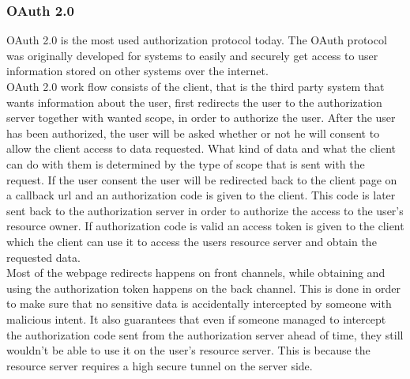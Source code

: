 \subsubsection{OAuth 2.0}
OAuth 2.0 is the most used authorization protocol today. The OAuth protocol was originally developed for systems to easily and securely get access to user information stored on other systems over the internet.
\\[11pt]
OAuth 2.0 work flow consists of the client, that is the third party system that wants information about the user, first redirects the user to the authorization server together with wanted scope, in order to authorize the user. After the user has been authorized, the user will be asked whether or not he will consent to allow the client access to data requested. What kind of data and what the client can do with them is determined by the type of scope that is sent with the request. If the user consent the user will be redirected back to the client page on a callback url and an authorization code is given to the client. This code is later sent back to the authorization server in order to authorize the access to the user's resource owner. If authorization code is valid an access token is given to the client which the client can use it to access the users resource server and obtain the requested data.
\\[11pt]
Most of the webpage redirects happens on front channels, while obtaining and using the authorization token happens on the back channel. This is done in order to make sure that no sensitive data is accidentally intercepted by someone with malicious intent. It also guarantees that even if someone managed to intercept the authorization code sent from the authorization server ahead of time, they still wouldn't be able to use it on the user's resource server. This is because the resource server requires a high secure tunnel on the server side.